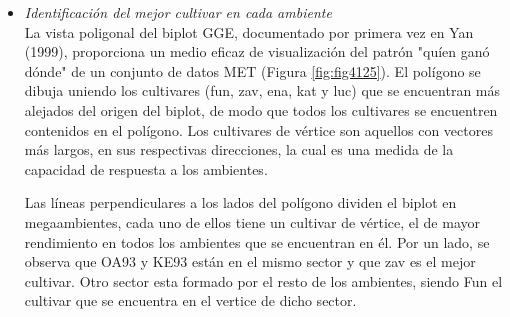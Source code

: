 \begin{itemize}[wide, nosep, labelindent = 0pt, topsep = 1ex, noitemsep,topsep=0pt]


\item \emph{Identificación del mejor cultivar en cada ambiente}\\

La vista poligonal del biplot GGE, documentado por primera vez en Yan (1999), proporciona un medio eficaz de visualización del patrón "quíen ganó dónde" de un conjunto de datos MET (Figura \ref{fig:fig4125}). 
El polígono se dibuja uniendo los cultivares (fun, zav, ena, kat y luc) que se encuentran más alejados del origen del biplot, de modo que todos los cultivares se encuentren contenidos en el polígono. Los cultivares de vértice son aquellos con  vectores más largos, en sus respectivas direcciones, la cual es una medida de la capacidad de respuesta a los ambientes. 

Las líneas perpendiculares a los lados del polígono dividen el biplot en megaambientes, cada uno de ellos tiene un cultivar de vértice, el de mayor rendimiento en todos los ambientes que se encuentran en él. Por un lado, se observa que OA93 y KE93 están en el mismo sector y que zav es el mejor cultivar. Otro sector esta formado por el resto de los ambientes, siendo Fun el cultivar que se encuentra en el vertice de dicho sector. 


\end{itemize}
